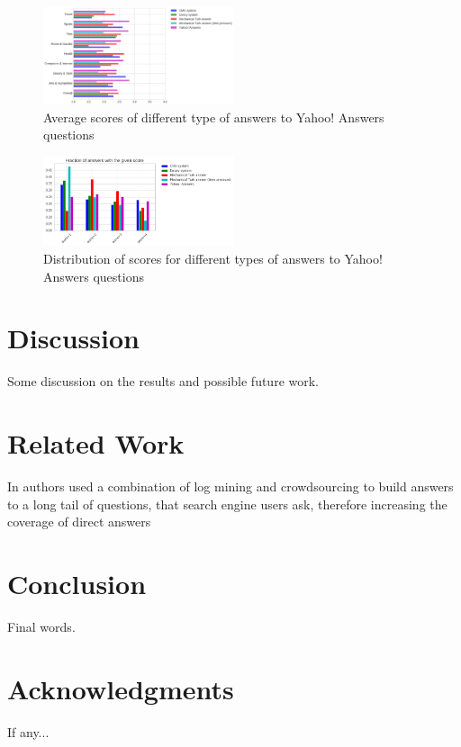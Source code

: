 \documentclass[11pt,letterpaper]{article}
\begin{document}
\begin{figure}[h]
\centering
\includegraphics[width=0.5\textwidth]{img/average_score}
\caption{Average scores of different type of answers to Yahoo! Answers questions}
\label{fig:average_score}
\end{figure}

\begin{figure}[h]
\centering
\includegraphics[width=0.5\textwidth]{img/scores_distribution}
\caption{Distribution of scores for different types of answers to Yahoo! Answers questions}
\label{fig:scores_distribution}
\end{figure}

\section{Discussion}
\label{sec:discussion}

Some discussion on the results and possible future work.

\section{Related Work}
\label{sec:related_work}

In \cite{bernstein2012direct} authors used a combination of log mining and crowdsourcing to build answers to a long tail of questions, that search engine users ask, therefore increasing the coverage of direct answers

\section{Conclusion}
\label{sec:conclusion}

Final words.

\section*{Acknowledgments}

If any...



\end{document}
